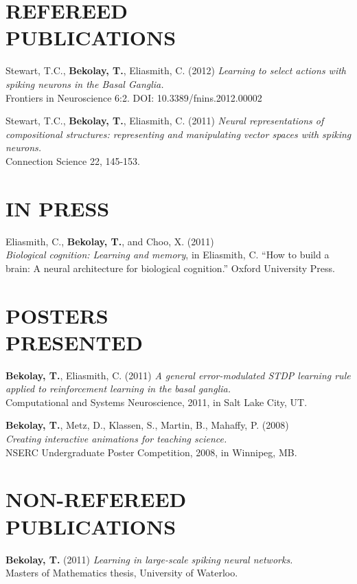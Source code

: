 \documentclass[line,margin]{res}
\begin{document}
\begin{resume}
\clearpage

\section{REFEREED \\PUBLICATIONS}
  Stewart, T.C., \textbf{Bekolay, T.}, Eliasmith, C. (2012)
    {\sl Learning to select actions with spiking neurons in the Basal Ganglia.} \\
    Frontiers in Neuroscience 6:2. DOI: 10.3389/fnins.2012.00002

  Stewart, T.C., \textbf{Bekolay, T.}, Eliasmith, C. (2011)
    {\sl Neural representations of compositional structures: representing and manipulating vector spaces with spiking neurons.} \\
    Connection Science 22, 145-153.

\section{IN PRESS}
  Eliasmith, C., \textbf{Bekolay, T.}, and Choo, X. (2011) \\
   {\sl Biological cognition: Learning and memory}, in Eliasmith, C. ``How to build a brain: A neural architecture for biological cognition.'' Oxford University Press.

\section{POSTERS \\PRESENTED}
  \textbf{Bekolay, T.}, Eliasmith, C. (2011)
    {\sl A general error-modulated STDP learning rule applied to reinforcement learning in the basal ganglia.} \\
    Computational and Systems Neuroscience, 2011, in Salt Lake City, UT.
  
  \textbf{Bekolay, T.}, Metz, D., Klassen, S., Martin, B., Mahaffy, P. (2008) \\
    {\sl Creating interactive animations for teaching science.} \\
    NSERC Undergraduate Poster Competition, 2008, in Winnipeg, MB.

\section{NON-REFEREED \\PUBLICATIONS}
  \textbf{Bekolay, T.} (2011)
    {\sl Learning in large-scale spiking neural networks.} \\
    Masters of Mathematics thesis, University of Waterloo.


\end{resume}
\end{document}
